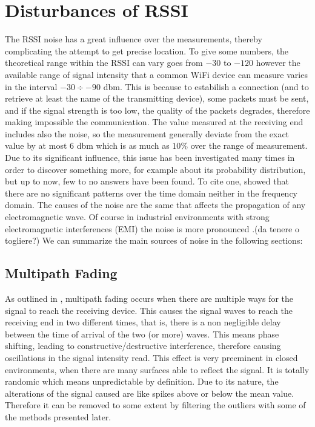 \documentclass[12pt,twoside]{report}
\begin{document}
\chapter{Disturbances of RSSI}
The RSSI noise has a great influence over the measurements, thereby complicating the attempt to get precise location. To give some numbers, the theoretical range within the RSSI can vary goes from $-30$ to $-120$ however the available range of signal intensity that a common WiFi device can measure varies in the interval $-30\div-90$ dbm. This is because to estabilish a connection (and to retrieve at least the name of the transmitting device), some packets must be sent, and if the signal strength is too low, the quality of the packets degrades, therefore making impossible the communication. The value measured at the receiving end includes also the noise, so the measurement generally deviate from the exact value by at most $6$ dbm which is as much as $10\%$ over the range of measurement.
Due to its significant influence, this issue has been investigated many times in order to discover something more, for example about its probability distribution, but up to now, few to no answers have been found. To cite one, \cite{4608603} showed that there are no significant patterns over the time domain neither in the frequency domain. The causes of the noise are the same that affects the propagation of any electromagnetic wave. Of course in industrial environments with strong electromagnetic interferences (EMI) the noise is more pronounced \cite{746e8399}.(da tenere o togliere?) We can summarize the main sources of noise in the following sections: 
\section{Multipath Fading} 
As outlined in \cite{onl11}, multipath fading occurs when there are multiple ways for the signal to reach the receiving device. This causes the signal waves to reach the receiving end in two different times, that is, there is a non negligible delay between the time of arrival of the two (or more) waves. This means phase shifting, leading to constructive/destructive interference, therefore causing oscillations in the signal intensity read. This effect is very preeminent in closed environments, when there are many surfaces able to reflect the signal. It is totally randomic \cite{10.5555/559977} which means unpredictable by definition. Due to its nature, the alterations of the signal caused are like spikes above or below the mean value. Therefore it can be removed to some extent by filtering the outliers with some of the methods presented later.
\end{document}
